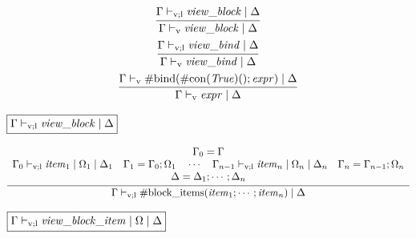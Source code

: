\begin{gather*}
    \infer{\Gamma \vdash_\mathrm{v} \mathit{view\_block} \mid \Delta}{
        \Gamma \vdash_{\mathrm{v}; \mathrm{l}} \mathit{view\_block} \mid \Delta
    }
    \\
    \infer{\Gamma \vdash_\mathrm{v} \mathit{view\_bind} \mid \Delta}{
        \Gamma \vdash_{\mathrm{v}; \mathrm{l}} \mathit{view\_bind} \mid \Delta
    }
    \\
    \infer{\Gamma \vdash_\mathrm{v} \mathit{expr} \mid \Delta}{
        \Gamma \vdash_\mathrm{v} \mathrm{\#bind}(\mathrm{\#con}(\mathit{True})(); \mathit{expr}) \mid \Delta
    }
\end{gather*}

$\fbox{$\Gamma \vdash_{\mathrm{v}; \mathrm{l}} \mathit{view\_block} \mid \Delta$}$

\begin{gather*}
    \infer{\Gamma \vdash_{\mathrm{v}; \mathrm{l}} \mathrm{\#block\_items}(\mathit{item}_1; \cdots; \mathit{item}_n) \mid \Delta}{
        \begin{array}{c}
            \Gamma_0 = \Gamma
            \\
            \Gamma_0 \vdash_{\mathrm{v}; \mathrm{l}} \mathit{item}_1 \mid \Omega_1 \mid \Delta_1
            \hspace{1em}
            \Gamma_1 = \Gamma_0; \Omega_1
            \hspace{1em}
            \cdots
            \hspace{1em}
            \Gamma_{n - 1} \vdash_{\mathrm{v}; \mathrm{l}} \mathit{item}_n \mid \Omega_n \mid \Delta_n
            \hspace{1em}
            \Gamma_n = \Gamma_{n - 1}; \Omega_n
            \\
            \Delta = \Delta_1; \cdots; \Delta_n
        \end{array}
    }
\end{gather*}

$\fbox{$\Gamma \vdash_{\mathrm{v}; \mathrm{l}} \mathit{view\_block\_item} \mid \Omega \mid \Delta$}$

